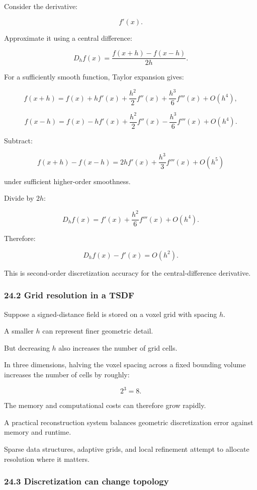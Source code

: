 Consider the derivative:

\[ f'(x). \]

Approximate it using a central difference:

\[ D_hf(x)= \frac{f(x+h)-f(x-h)}{2h}. \]

For a sufficiently smooth function, Taylor expansion gives:

\[ f(x+h)= f(x)+hf'(x)+\frac{h^2}{2}f''(x) +\frac{h^3}{6}f'''(x)+O(h^4), \]

\[ f(x-h)= f(x)-hf'(x)+\frac{h^2}{2}f''(x) -\frac{h^3}{6}f'''(x)+O(h^4). \]

Subtract:

\[ f(x+h)-f(x-h) = 2hf'(x)+\frac{h^3}{3}f'''(x)+O(h^5) \]

under sufficient higher-order smoothness.

Divide by \(2h\):

\[ D_hf(x)= f'(x)+\frac{h^2}{6}f'''(x)+O(h^4). \]

Therefore:

\[ \boxed{ D_hf(x)-f'(x)=O(h^2) }. \]

This is second-order discretization accuracy for the central-difference derivative.

\subsubsection{24.2 Grid resolution in a TSDF}\label{grid-resolution-in-a-tsdf}

Suppose a signed-distance field is stored on a voxel grid with spacing \(h\).

A smaller \(h\) can represent finer geometric detail.

But decreasing \(h\) also increases the number of grid cells.

In three dimensions, halving the voxel spacing across a fixed bounding volume increases the number of cells by roughly:

\[ 2^3=8. \]

The memory and computational costs can therefore grow rapidly.

A practical reconstruction system balances geometric discretization error against memory and runtime.

Sparse data structures, adaptive grids, and local refinement attempt to allocate resolution where it matters.

\subsubsection{24.3 Discretization can change topology}\label{discretization-can-change-topology}

